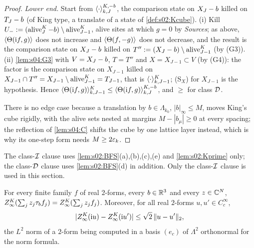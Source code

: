 \begin{proof}
\emph{Lower end.} Start from $\langle \cdot\rangle^{K,-b}_{k,J}$, the comparison state on $X_J-b$ killed on $T_J-b$ (of King type, a translate of a state of \cref{def:s02:Kcube}). (i) Kill $U_-:=(\operatorname{alive}^K_J-b)\setminus\operatorname{alive}^K_{J-1}$, alive sites at which $g=0$ by \emph{Sources}; as above, $\langle \Theta(\mathrm if,g)\rangle$ does not increase and $\langle \Theta(f,-g)\rangle$ does not decrease, and the result is the comparison state on $X_J-b$ killed on $T'':=(X_J-b)\setminus\operatorname{alive}^K_{J-1}$ (by (G3)). (ii) \cref{lem:s04:G3} with $V=X_J-b$, $T=T''$ and $X=X_{J-1}\subset V$ (by (G4)): the factor is the comparison state on $X_{J-1}$ killed on $X_{J-1}\cap T''=X_{J-1}\setminus\operatorname{alive}^K_{J-1}=T_{J-1}$, that is $\langle \cdot\rangle^K_{k,J-1}$; (S$_X$) for $X_{J-1}$ is the hypothesis. Hence $\langle \Theta(\mathrm if,g)\rangle^K_{k,J-1}\le\langle \Theta(\mathrm if,g)\rangle^{K,-b}_{k,J}$, and $\ge$ for class $\mathcal D$.

There is no edge case because a translation by $b\in\Lambda_{k_0}$, $|b|_\infty\le M$, moves King's cube rigidly, with the alive sets nested at margins $M-|b_\mu|\ge0$ at every spacing; the reflection of \cref{lem:s04:C} shifts the cube by one lattice layer instead, which is why its one-step form needs $M\ge2\varepsilon_k$.
\end{proof}

The class-$\mathcal I$ clause uses \cref{lem:s02:BFS}(a),(b),(c),(e) and \cref{lem:s02:Kprime} only; the class-$\mathcal D$ clause uses \cref{lem:s02:BFS}(d) in addition. Only the class-$\mathcal I$ clause is used in this section.

\begin{corollary}\label{cor:s06:TK}
For every finite family $f$ of real $2$-forms, every $b\in\mathbb R^3$ and every $z\in\mathbb C^N$, $Z^{K}_{\infty}(\sum_jz_j\tau_bf_j)=Z^{K}_{\infty}(\sum_jz_jf_j)$. Moreover, for all real $2$-forms $u,u'\in C^\infty_c$,
\[
|Z^{K}_{\infty}(\mathrm iu)-Z^{K}_{\infty}(\mathrm iu')|\le\sqrt2\,\lVert u-u'\rVert_2,
\]
the $L^2$ norm of a $2$-form being computed in a basis $(e_c)$ of $\Lambda^2$ orthonormal for the norm formula.
\end{corollary}

